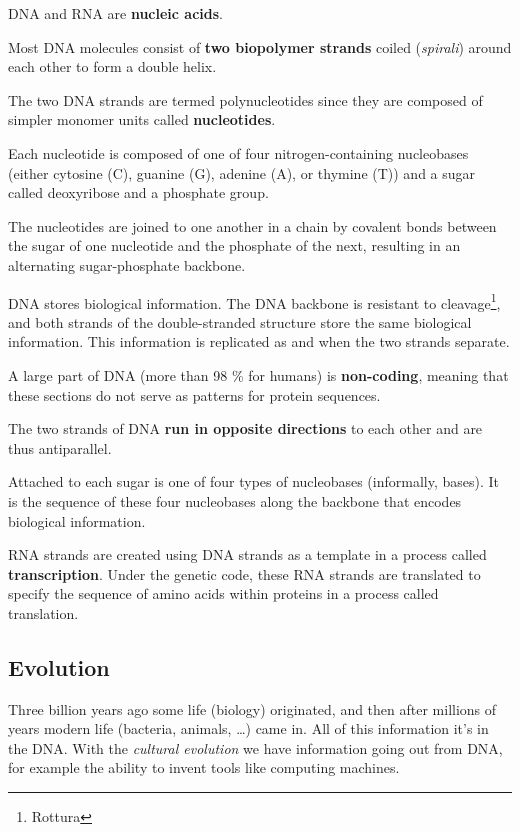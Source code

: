 DNA and RNA are \textbf{nucleic acids}.

Most DNA molecules consist of \textbf{two biopolymer strands} coiled
(\textit{spirali}) around each other to form a double helix.

The two DNA strands are termed polynucleotides since they are composed of
simpler monomer units called \textbf{nucleotides}.

Each nucleotide is composed of one of four nitrogen-containing
nucleobases (either cytosine (C), guanine (G), adenine (A), or thymine
(T)) and a sugar called deoxyribose and a phosphate group.

The nucleotides are joined to one another in a chain by covalent bonds between
the sugar of one nucleotide and the phosphate of the next, resulting in an
alternating sugar-phosphate backbone.

DNA stores biological information.
The DNA backbone is resistant to cleavage\footnote{Rottura}, and both strands of
the double-stranded structure store the same biological information. This
information is replicated as and when the two strands separate.

A large part of DNA (more than 98 \% for humans) is \textbf{non-coding},
meaning that these sections do not serve as patterns for protein sequences.

The two strands of DNA \textbf{run in opposite directions} to each other and
are thus antiparallel.

Attached to each sugar is one of four types of nucleobases (informally, bases).
It is the sequence of these four nucleobases along the backbone that encodes
biological information.

RNA strands are created using DNA strands as a template in a process called
\textbf{transcription}.
Under the genetic code, these RNA strands are translated to specify the
sequence of amino acids within proteins in a process called translation.

\subsection{Evolution}

Three billion years ago some life (biology) originated, and then after millions
of years modern life (bacteria, animals, \dots) came in. All of this information
it's in the DNA. With the \textit{cultural evolution} we have information going
out from DNA, for example the ability to invent tools like computing machines.

